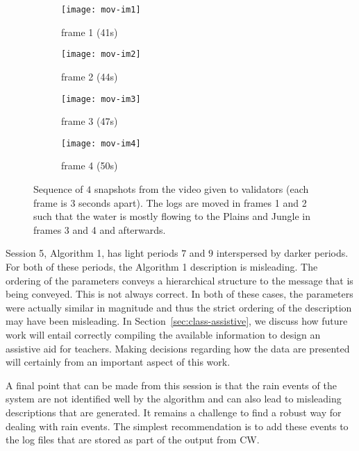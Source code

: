 \begin{appendices}
\begin{figure}
\centering
\begin{subfigure}{.24\textwidth}
  \centering
  \texttt{[image: mov-im1]}
  \caption{frame 1 (41s)}
\end{subfigure}%
\begin{subfigure}{.24\textwidth}
  \centering
  \texttt{[image: mov-im2]}
  \caption{frame 2 (44s)}
\end{subfigure}
\begin{subfigure}{.24\textwidth}
  \centering
  \texttt{[image: mov-im3]}
  \caption{frame 3 (47s)}
\end{subfigure}
\begin{subfigure}{.24\textwidth}
  \centering
  \texttt{[image: mov-im4]}
  \caption{frame 4 (50s)}
\end{subfigure}
\caption{Sequence of $4$ snapshots from the video given to validators (each frame is 3 seconds apart). The logs are moved in frames 1 and 2 such that the water is mostly flowing to the Plains and Jungle in frames 3 and 4 and afterwards.}
\label{fig:test}
\end{figure}

Session 5, Algorithm 1, has light periods $7$ and $9$ interspersed by darker periods. For both of these periods, the Algorithm 1 description is misleading. The ordering of the parameters conveys a hierarchical structure to the message that is being conveyed. This is not always correct. In both of these cases, the parameters were actually similar in magnitude and thus the strict ordering of the description may have been misleading. In Section~\ref{sec:class-assistive}, we discuss how future work will entail correctly compiling the available information to design an assistive aid for teachers. Making decisions regarding how the data are presented will certainly from an important aspect of this work.

A final point that can be made from this session is that the rain events of the system are not identified well by the algorithm and can also lead to misleading descriptions that are generated. It remains a challenge to find a robust way for dealing with rain events. The simplest recommendation is to add these events to the log files that are stored as part of the output from CW.



\end{appendices}
